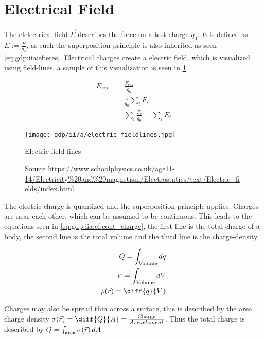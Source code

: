\section{Electrical Field}

The elelectrical field $\vec{E}$ describes the force on a test-charge $q_0$.
$E$ is defined as $E := \frac{E}{q_0}$,
    as such the superposition principle is also inherited as seen \ref{eq:gdp:iia:ef:eres}.
Electrical charges create a electric field,
    which is visualized using field-lines, 
    a sample of this visualization is seen in \ref{fig:gdp:iia:ef:fieldlines}


\begin{equation}
    \label{eq:gdp:iia:ef:eres}
\begin{split}
    E_{res} & = \frac{F_{res}}{q_0}\\ 
    & = \frac{1}{q_0} \sum_i F_i \\ 
    & = \sum_i \frac{F_i}{q_0} = \sum_i E_i
\end{split}
\end{equation}

\begin{figure}
    \texttt{[image: gdp/ii/a/electric\_fieldlines.jpg]}
    \caption{Electric field lines}
    \label{fig:gdp:iia:ef:fieldlines}
    \caption*{Source \url{https://www.schoolphysics.co.uk/age11-14/Electricity\%20and\%20magnetism/Electrostatics/text/Electric_fields/index.html}}
\end{figure}

The electric charge is quantized and the superposition principle applies.
Charges are near each other,
    which can be assumed to be continuous.
This leads to the equations seen in \ref{eq:gdp:iia:ef:cont_charge},
    the first line is the total charge of a body,
    the second line is the total volume 
    and the third line is the charge-density.


\begin{align}
    \label{eq:gdp:iia:ef:cont_charge}
    Q = \int_{\text{Volume}} dq\\ 
    V = \int_{\text{Volume}} dV \\ 
    \rho(\vec{r}) = \diff{q}{V}
\end{align}

Charges may also be spread thin across a surface,
    this is described by the area charge density $\sigma(\vec{r}) = \diff{Q}{A} = \frac{\text{Charge}}{Area element}$.
Thus the total charge is described by $Q = \int_{\text{area}} \sigma(\vec{r}) \mathop{dA} $






















